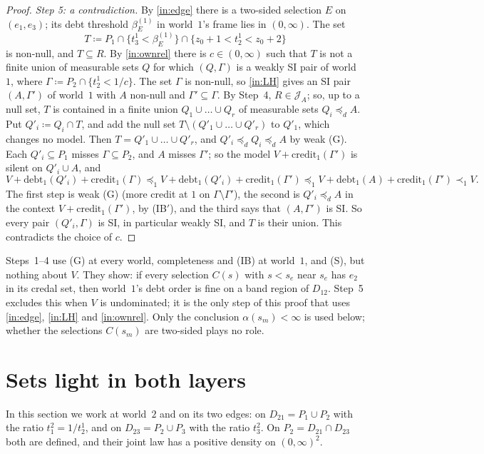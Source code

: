 \documentclass[11pt]{article}
\theoremstyle{definition}\newtheorem{definition}[theorem]{Definition}
\theoremstyle{remark}\newtheorem{remark}[theorem]{Remark}
\newcommand{\debt}{\mathrm{debt}}
\newcommand{\cred}{\mathrm{credit}}
\newcommand{\Jid}{\mathcal J}
\begin{document}
\begin{proof}
\emph{Step 5: a contradiction.} By \ref{in:edge} there is a two-sided
selection $E$ on $(e_1,e_3)$; its debt threshold $\beta^{(1)}_E$ in
world~$1$'s frame lies in $(0,\infty)$. The set
\[
 T\coloneqq P_1\cap\{t^1_3<\beta^{(1)}_E\}\cap\{z_0+1<t^1_2<z_0+2\}
\]
is non-null, and $T\subseteq R$. By \ref{in:ownrel} there is
$c\in(0,\infty)$ such that $T$ is not a finite union of measurable sets $Q$
for which $(Q,\Gamma)$ is a weakly SI pair of world~$1$, where
$\Gamma\coloneqq P_2\cap\{t^1_2<1/c\}$. The set $\Gamma$ is non-null, so
\ref{in:LH} gives an SI pair $(A,\Gamma')$ of world~$1$ with $A$ non-null and
$\Gamma'\subseteq\Gamma$. By Step~4, $R\in\Jid_A$; so, up to a null set, $T$
is contained in a finite union $Q_1\cup\dots\cup Q_r$ of measurable sets
$Q_i\preceq_dA$. Put $Q'_i\coloneqq Q_i\cap T$, and add the null set
$T\setminus(Q'_1\cup\dots\cup Q'_r)$ to $Q'_1$, which changes no model. Then
$T=Q'_1\cup\dots\cup Q'_r$, and $Q'_i\preceq_dQ_i\preceq_dA$ by weak (G).
Each $Q'_i\subseteq P_1$ misses $\Gamma\subseteq P_2$, and $A$ misses
$\Gamma'$; so the model $V+\cred_1(\Gamma')$ is silent on $Q'_i\cup A$, and
\[
 V+\debt_1(Q'_i)+\cred_1(\Gamma)\preceq_1V+\debt_1(Q'_i)+\cred_1(\Gamma')
 \preceq_1V+\debt_1(A)+\cred_1(\Gamma')\prec_1V.
\]
The first step is weak (G) (more credit at $1$ on $\Gamma\setminus\Gamma'$),
the second is $Q'_i\preceq_dA$ in the context $V+\cred_1(\Gamma')$, by
(IB$'$), and the third says that $(A,\Gamma')$ is SI. So every pair
$(Q'_i,\Gamma)$ is SI, in particular weakly SI, and $T$ is their union. This
contradicts the choice of $c$.
\end{proof}

Steps~1--4 use (G) at every world, completeness and (IB) at world~$1$, and
(S), but nothing about $V$. They show: if every selection $C(s)$ with
$s<s_e$ near $s_e$ has $e_2$ in its credal set, then world~$1$'s debt order
is fine on a band region of $D_{12}$. Step~5 excludes this when $V$ is
undominated; it is the only step of this proof that uses \ref{in:edge},
\ref{in:LH} and \ref{in:ownrel}. Only the conclusion
$\alpha(s_m)<\infty$ is used below; whether the selections $C(s_m)$ are
two-sided plays no role.

\section{Sets light in both layers}\label{sec:light}

In this section we work at world~$2$ and on its two edges: on
$D_{21}=P_1\cup P_2$ with the ratio $t^2_1=1/t^1_2$, and on
$D_{23}=P_2\cup P_3$ with the ratio $t^2_3$. On $P_2=D_{21}\cap D_{23}$
both are defined, and their joint law has a positive density on
$(0,\infty)^2$.
\end{document}
